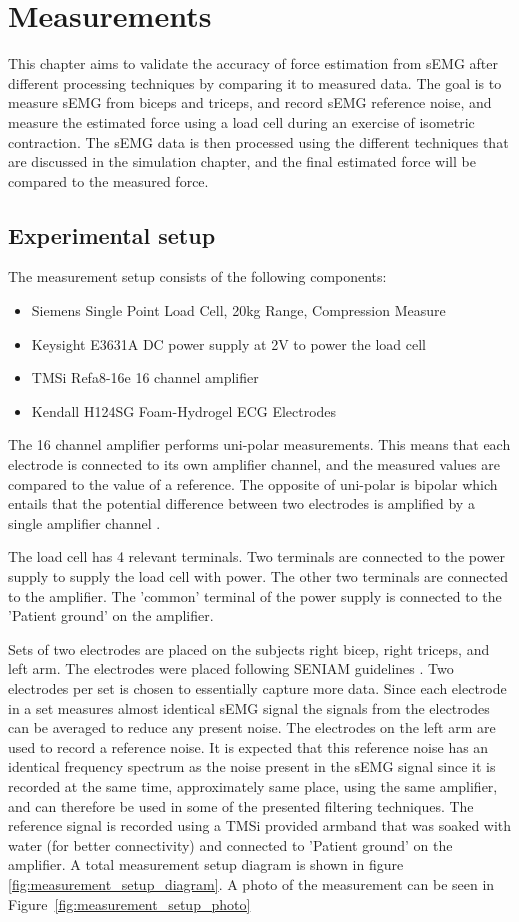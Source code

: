 \chapter{Measurements}
This chapter aims to validate the accuracy of force estimation from sEMG after different processing techniques by comparing it to measured data. The goal is to measure sEMG from biceps and triceps, and record sEMG reference noise, and measure the estimated force using a load cell during an exercise of isometric contraction. The sEMG data is then processed using the different techniques that are discussed in the simulation chapter, and the final estimated force will be compared to the measured force. 

\section{Experimental setup}
The measurement setup consists of the following components:
\begin{itemize}
    \item Siemens Single Point Load Cell, 20kg Range, Compression Measure
    \item Keysight E3631A DC power supply at 2V to power the load cell
    \item TMSi Refa8-16e 16 channel amplifier
    \item Kendall H124SG Foam-Hydrogel ECG Electrodes 
\end{itemize}

The 16 channel amplifier performs uni-polar measurements. This means that each electrode is connected to its own amplifier channel, and the measured values are compared to the value of a reference. The opposite of uni-polar is bipolar which entails that the potential difference between two electrodes is amplified by a single amplifier channel \cite{tmsi_unipolar_bipolar}. 

The load cell has 4 relevant terminals. Two terminals are connected to the power supply to supply the load cell with power. The other two terminals are connected to the amplifier. The 'common' terminal of the power supply is connected to the 'Patient ground' on the amplifier.

Sets of two electrodes are placed on the subjects right bicep, right triceps, and left arm. The electrodes were placed following SENIAM guidelines \cite{seniam}. Two electrodes per set is chosen to essentially capture more data. Since each electrode in a set measures almost identical sEMG signal the signals from the electrodes can be averaged to reduce any present noise. The electrodes on the left arm are used to record a reference noise. It is expected that this reference noise has an identical frequency spectrum as the noise present in the sEMG signal since it is recorded at the same time, approximately same place, using the same amplifier, and can therefore be used in some of the presented filtering techniques. The reference signal is recorded using a TMSi provided armband that was soaked with water (for better connectivity) and connected to 'Patient ground' on the amplifier. A total measurement setup diagram is shown in figure \ref{fig:measurement_setup_diagram}. A photo of the measurement can be seen in Figure~\ref{fig:measurement_setup_photo}

